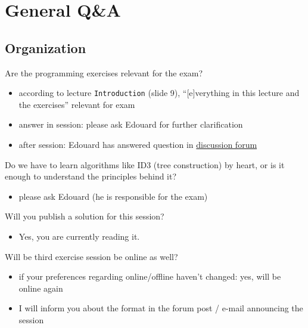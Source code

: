 \documentclass[12pt]{article}
\newcommand{\code}[1]{\textcolor{kitgreen}{\texttt{#1}}}
\begin{document}
\section*{General Q\&A}

\subsection*{Organization}

\begin{question}
	Are the programming exercises relevant for the exam?
\end{question}

\begin{itemize}[left=0pt, nosep]
	\item according to lecture \code{Introduction} (slide 9), ``[e]verything in this lecture and the exercises'' relevant for exam
	\item answer in session: please ask Edouard for further clarification
	\item after session: Edouard has answered question in \href{https://ilias.studium.kit.edu/ilias.php?ref_id=1641269&cmdClass=ilobjforumgui&thr_pk=218698&cmd=viewThread&cmdNode=uk:lk&baseClass=ilRepositoryGUI}{discussion forum}
\end{itemize}

\begin{question}
	Do we have to learn algorithms like ID3 (tree construction) by heart, or is it enough to understand the principles behind it?
\end{question}

\begin{itemize}[left=0pt, nosep]
	\item please ask Edouard (he is responsible for the exam)
\end{itemize}

\begin{question}
	Will you publish a solution for this session?
\end{question}

\begin{itemize}[left=0pt, nosep]
	\item Yes, you are currently reading it.
\end{itemize}

\begin{question}
	Will be third exercise session be online as well?
\end{question}

\begin{itemize}[left=0pt, nosep]
	\item if your preferences regarding online/offline haven't changed: yes, will be online again
	\item I will inform you about the format in the forum post / e-mail announcing the session
\end{itemize}
\end{document}
